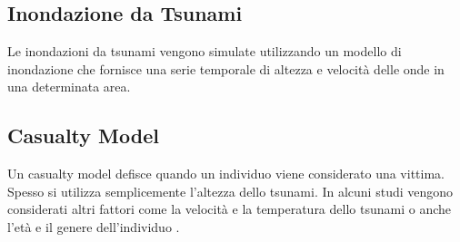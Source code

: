 \subsection{Inondazione da Tsunami}
Le inondazioni da tsunami vengono simulate utilizzando un modello di inondazione
che fornisce una serie temporale di altezza e velocità delle onde in una determinata area.

\subsection{Casualty Model}
Un casualty model defisce quando un individuo viene considerato una vittima.
Spesso si utilizza semplicemente l'altezza dello tsunami.
In alcuni studi vengono considerati altri fattori come la velocità
e la temperatura dello tsunami o anche l'età e il genere dell'individuo \cite{yeh2010gender}.

